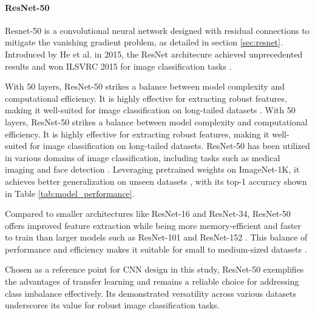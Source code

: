 \paragraph{ResNet-50}
Resnet-50 \cite{he2015deepresiduallearningimage} is a convolutional neural network designed with residual connections to mitigate the vanishing gradient problem, as detailed in section \ref{sec:resnet}. Introduced by He et al. in 2015, the ResNet architecure achieved unprecedented results and won ILSVRC 2015 for image classification tasks \cite{ILSVRC15}. 

With 50 layers, ResNet-50 strikes a balance between model complexity and computational efficiency. It is highly effective for extracting robust features, making it well-suited for image classification on long-tailed datasets \cite{he2015deepresiduallearningimage}. With 50 layers, ResNet-50 strikes a balance between model complexity and computational efficiency. It is highly effective for extracting robust features, making it well-suited for image classification on long-tailed datasets. ResNet-50 has been utilized in various domains of image classification, including tasks such as medical imaging \cite{huang2022identifyingkeycomponentsresnet50, Simegn} and face detection \cite{Nyarko2022}. Leveraging pretrained weights on ImageNet-1K, it achieves better generalization on unseen datasets \cite{resnettransfer,RAZAVI2024123276,chan2019transfer,Shafiq2022}, with its top-1 accuracy shown in Table \ref{tab:model_performance}. 

Compared to smaller architectures like ResNet-16 and ResNet-34, ResNet-50 offers improved feature extraction while being more memory-efficient and faster to train than larger models such as ResNet-101 and ResNet-152 \cite{he2015deepresiduallearningimage}. This balance of performance and efficiency makes it suitable for small to medium-sized datasets \cite{10083966}.

Chosen as a reference point for CNN design in this study, ResNet-50 exemplifies the advantages of transfer learning and remains a reliable choice for addressing class imbalance effectively. Its demonstrated versatility across various datasets underscores its value for robust image classification tasks.

